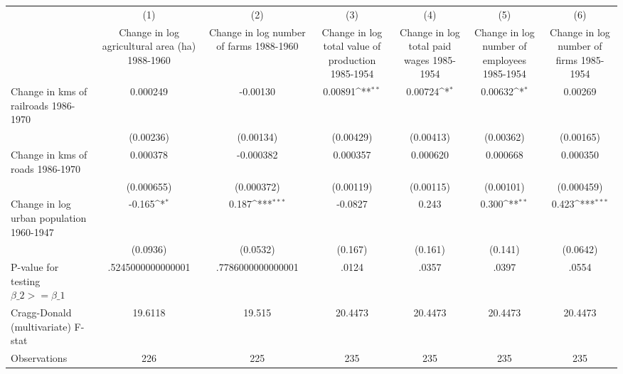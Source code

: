 {
\def\sym#1{\ifmmode^{#1}\else\(^{#1}\)\fi}
\begin{tabular}{l*{6}{c}}
\hline\hline
                &\multicolumn{1}{c}{(1)}&\multicolumn{1}{c}{(2)}&\multicolumn{1}{c}{(3)}&\multicolumn{1}{c}{(4)}&\multicolumn{1}{c}{(5)}&\multicolumn{1}{c}{(6)}\\
                &\multicolumn{1}{c}{Change in log agricultural area (ha) 1988-1960}&\multicolumn{1}{c}{Change in log number of farms 1988-1960}&\multicolumn{1}{c}{Change in log total value of production 1985-1954}&\multicolumn{1}{c}{Change in log total paid wages 1985-1954}&\multicolumn{1}{c}{Change in log number of employees 1985-1954}&\multicolumn{1}{c}{Change in log number of firms 1985-1954}\\
\hline
Change in kms of railroads 1986-1970& 0.000249         & -0.00130         &  0.00891\sym{**} &  0.00724\sym{*}  &  0.00632\sym{*}  &  0.00269         \\
                &(0.00236)         &(0.00134)         &(0.00429)         &(0.00413)         &(0.00362)         &(0.00165)         \\
[1em]
Change in kms of roads 1986-1970& 0.000378         &-0.000382         & 0.000357         & 0.000620         & 0.000668         & 0.000350         \\
                &(0.000655)         &(0.000372)         &(0.00119)         &(0.00115)         &(0.00101)         &(0.000459)         \\
[1em]
Change in log urban population 1960-1947&   -0.165\sym{*}  &    0.187\sym{***}&  -0.0827         &    0.243         &    0.300\sym{**} &    0.423\sym{***}\\
                & (0.0936)         & (0.0532)         &  (0.167)         &  (0.161)         &  (0.141)         & (0.0642)         \\
\hline
P-value for testing $\beta\_{2} >= \beta\_{1}$&.5245000000000001         &.7786000000000001         &    .0124         &    .0357         &    .0397         &    .0554         \\
Cragg-Donald (multivariate) F-stat&  19.6118         &   19.515         &  20.4473         &  20.4473         &  20.4473         &  20.4473         \\
Observations    &      226         &      225         &      235         &      235         &      235         &      235         \\
\hline\hline
\end{tabular}
}
